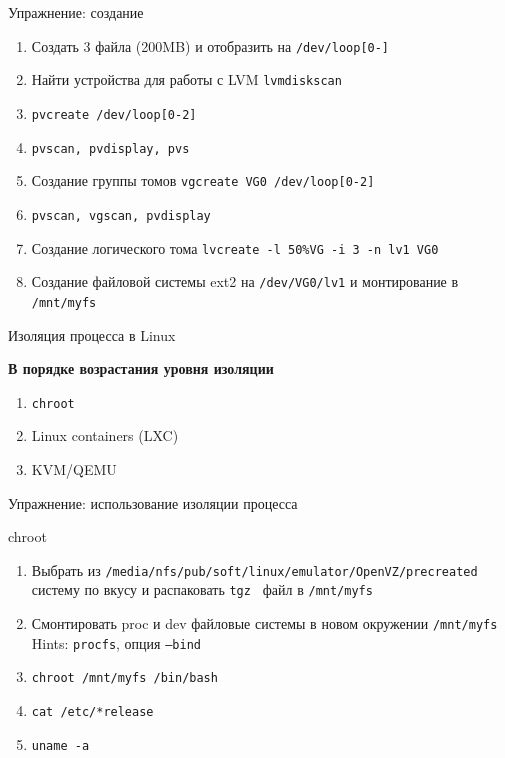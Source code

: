 \documentclass[ignorenonframetext, professionalfonts, hyperref={pdftex, unicode}]{beamer}
\begin{document}
\begin{frame}{Упражнение: создание}
  \begin{enumerate}
    \item Создать 3 файла (200MB) и отобразить на {\tt /dev/loop[0-]}
	\item Найти устройства для работы с LVM {\tt lvmdiskscan}
	\item  {\tt pvcreate /dev/loop[0-2]}
    \item  {\tt pvscan, pvdisplay, pvs}
		\pause
    \item Создание группы томов {\tt vgcreate VG0 /dev/loop[0-2]}
    \item {\tt pvscan, vgscan, pvdisplay}
		\pause
    \item Создание логического тома {\tt lvcreate  -l 50\%VG -i 3 -n lv1 VG0}
	\item Создание файловой системы ext2 на {\tt /dev/VG0/lv1} и монтирование в {\tt /mnt/myfs}
	\end{enumerate}
\end{frame}

\begin{frame}{Изоляция процесса в Linux}
  \begin{center}
    \textbf{В порядке возрастания уровня изоляции}
  \end{center}
  \begin{enumerate}
    \item {\tt chroot}
    \item Linux containers (LXC)
    \item KVM/QEMU
  \end{enumerate}
\end{frame}

\begin{frame}{Упражнение: использование изоляции процесса}
  \begin{block}{chroot}
    \begin{enumerate}
      \item Выбрать из {\tt /media/nfs/pub/soft/linux/emulator/OpenVZ/precreated} систему по вкусу и распаковать {\tt tgz } файл в {\tt /mnt/myfs}
      \item Смонтировать proc и dev файловые системы в новом окружении {\tt /mnt/myfs} \\
		  Hints: {\tt procfs}, опция {\tt --bind}
      \item {\tt chroot /mnt/myfs /bin/bash}
	  \item {\tt cat /etc/*release}
	  \item {\tt uname -a}
    \end{enumerate}
  \end{block}
\end{frame}
\end{document}
